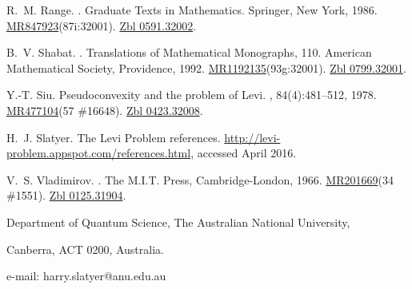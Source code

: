 \documentclass[11pt,a4paper, final, twoside]{article}
\numberwithin{equation}{section}
\begin{document}
\begin{thebibliography}{10}
R.~M. Range.
.
\newblock Graduate Texts in Mathematics. Springer, New York, 1986.
\newblock
  \href{http://www.ams.org/mathscinet-getitem?mr=847923}{MR847923}(87i:32001).
  \href{http://zbmath.org/?q=an:0591.32002}{Zbl 0591.32002}.

B.~V. Shabat.
.
\newblock Translations of Mathematical Monographs, 110. American Mathematical
  Society, Providence, 1992.
\newblock
  \href{http://www.ams.org/mathscinet-getitem?mr=1192135}{MR1192135}(93g:32001).
  \href{http://zbmath.org/?q=an:0799.32001}{Zbl 0799.32001}.

Y.-T. Siu.
\newblock Pseudoconvexity and the problem of {L}evi.
, 84(4):481--512,
  1978.
\newblock \href{http://www.ams.org/mathscinet-getitem?mr=477104}{MR477104}(57
  \#16648). \href{http://zbmath.org/?q=an:0423.32008}{Zbl 0423.32008}.

H.~J. Slatyer.
\newblock The Levi Problem references.
\newblock \url{http://levi-problem.appspot.com/references.html},
  accessed April 2016.

V.~S. Vladimirov.
.
\newblock The M.I.T. Press, Cambridge-London, 1966.
\newblock \href{http://www.ams.org/mathscinet-getitem?mr=201669}{MR201669}(34
  \#1551). \href{http://zbmath.org/?q=an:0125.31904}{Zbl 0125.31904}.

\end{thebibliography}

{\footnotesize Department of Quantum Science, The Australian National University,}

{\footnotesize Canberra, ACT 0200, Australia.}

{\footnotesize e-mail: harry.slatyer@anu.edu.au}
\end{document}
